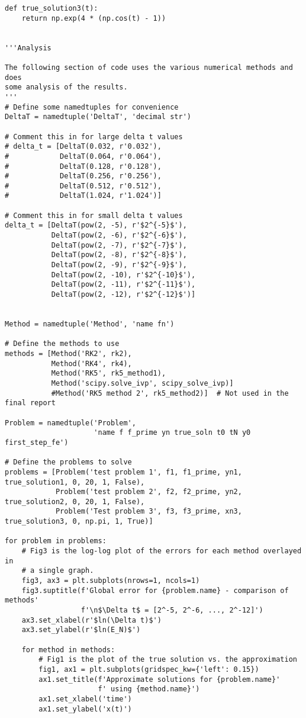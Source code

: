 \documentclass{article}
\begin{document}
\begin{verbatim}
def true_solution3(t):
    return np.exp(4 * (np.cos(t) - 1))


'''Analysis

The following section of code uses the various numerical methods and does
some analysis of the results.
'''
# Define some namedtuples for convenience
DeltaT = namedtuple('DeltaT', 'decimal str')

# Comment this in for large delta t values
# delta_t = [DeltaT(0.032, r'0.032'),
#            DeltaT(0.064, r'0.064'),
#            DeltaT(0.128, r'0.128'),
#            DeltaT(0.256, r'0.256'),
#            DeltaT(0.512, r'0.512'),
#            DeltaT(1.024, r'1.024')]

# Comment this in for small delta t values
delta_t = [DeltaT(pow(2, -5), r'$2^{-5}$'),
           DeltaT(pow(2, -6), r'$2^{-6}$'),
           DeltaT(pow(2, -7), r'$2^{-7}$'),
           DeltaT(pow(2, -8), r'$2^{-8}$'),
           DeltaT(pow(2, -9), r'$2^{-9}$'),
           DeltaT(pow(2, -10), r'$2^{-10}$'),
           DeltaT(pow(2, -11), r'$2^{-11}$'),
           DeltaT(pow(2, -12), r'$2^{-12}$')]


Method = namedtuple('Method', 'name fn')

# Define the methods to use
methods = [Method('RK2', rk2),
           Method('RK4', rk4),
           Method('RK5', rk5_method1),
           Method('scipy.solve_ivp', scipy_solve_ivp)]
           #Method('RK5 method 2', rk5_method2)]  # Not used in the final report

Problem = namedtuple('Problem',
                     'name f f_prime yn true_soln t0 tN y0 first_step_fe')

# Define the problems to solve
problems = [Problem('test problem 1', f1, f1_prime, yn1, true_solution1, 0, 20, 1, False),
            Problem('test problem 2', f2, f2_prime, yn2, true_solution2, 0, 20, 1, False),
            Problem('Test problem 3', f3, f3_prime, xn3, true_solution3, 0, np.pi, 1, True)]

for problem in problems:
    # Fig3 is the log-log plot of the errors for each method overlayed in
    # a single graph.
    fig3, ax3 = plt.subplots(nrows=1, ncols=1)
    fig3.suptitle(f'Global error for {problem.name} - comparison of methods'
                  f'\n$\Delta t$ = [2^-5, 2^-6, ..., 2^-12]')
    ax3.set_xlabel(r'$ln(\Delta t)$')
    ax3.set_ylabel(r'$ln(E_N)$')

    for method in methods:
        # Fig1 is the plot of the true solution vs. the approximation
        fig1, ax1 = plt.subplots(gridspec_kw={'left': 0.15})
        ax1.set_title(f'Approximate solutions for {problem.name}'
                      f' using {method.name}')
        ax1.set_xlabel('time')
        ax1.set_ylabel('x(t)')


\end{verbatim}
\end{document}
